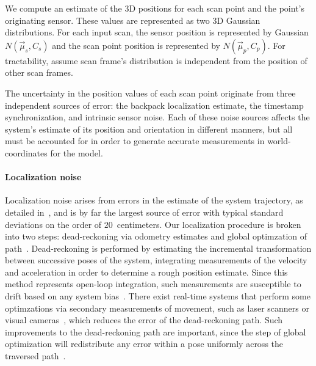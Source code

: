 \documentclass[12pt,onecolumn,oneside]{book}
\begin{document}
We compute an estimate of the 3D positions for each scan point and the point's originating sensor.  These values are represented as two 3D Gaussian distributions.  For each input scan, the sensor position is represented by Gaussian $N(\vec{\mu}_s,C_s)$ and the scan point position is represented by $N(\vec{\mu}_p,C_p)$.  For tractability, assume scan frame's distribution is independent from the position of other scan frames.

The uncertainty in the position values of each scan point originate from three independent sources of error: the backpack localization estimate, the timestamp synchronization, and intrinsic sensor noise.  Each of these noise sources affects the system's estimate of its position and orientation in different manners, but all must be accounted for in order to generate accurate measurements in world-coordinates for the model.

\paragraph*{Localization noise}
Localization noise arises from errors in the estimate of the system trajectory, as detailed in~\cite{NickJournal}, and is by far the largest source of error with typical standard deviations on the order of $20$~centimeters.  Our localization procedure is broken into two steps: dead-reckoning via odometry estimates and global optimzation of path~\cite{toro05,fastslam03}.  Dead-reckoning is performed by estimating the incremental transformation between successive poses of the system, integrating measurements of the velocity and acceleration in order to determine a rough position estimate.  Since this method represents open-loop integration, such measurements are susceptible to drift based on any system bias~\cite{Backpack,ProbabilisticRobotics}.  There exist real-time systems that perform some optimzations via secondary measurements of movement, such as laser scanners or visual cameras~\cite{Shelley14}, which reduces the error of the dead-reckoning path.  Such improvements to the dead-reckoning path are important, since the step of global optimization will redistribute any error within a pose uniformly across the traversed path~\cite{toro07}.
\end{document}
